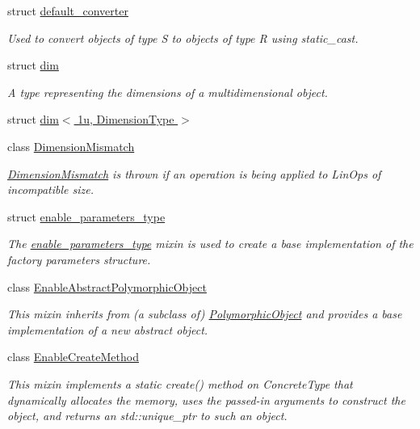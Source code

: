 \begin{DoxyCompactItemize}
struct \hyperlink{structgko_1_1default__converter}{default\+\_\+converter}
\begin{DoxyCompactList}\small\item\em Used to convert objects of type {\ttfamily S} to objects of type {\ttfamily R} using static\+\_\+cast. \end{DoxyCompactList}\item 
struct \hyperlink{structgko_1_1dim}{dim}
\begin{DoxyCompactList}\small\item\em A type representing the dimensions of a multidimensional object. \end{DoxyCompactList}\item 
struct \hyperlink{structgko_1_1dim_3_011u_00_01DimensionType_01_4}{dim$<$ 1u, Dimension\+Type $>$}
\item 
class \hyperlink{classgko_1_1DimensionMismatch}{Dimension\+Mismatch}
\begin{DoxyCompactList}\small\item\em \hyperlink{classgko_1_1DimensionMismatch}{Dimension\+Mismatch} is thrown if an operation is being applied to Lin\+Ops of incompatible size. \end{DoxyCompactList}\item 
struct \hyperlink{structgko_1_1enable__parameters__type}{enable\+\_\+parameters\+\_\+type}
\begin{DoxyCompactList}\small\item\em The \hyperlink{structgko_1_1enable__parameters__type}{enable\+\_\+parameters\+\_\+type} mixin is used to create a base implementation of the factory parameters structure. \end{DoxyCompactList}\item 
class \hyperlink{classgko_1_1EnableAbstractPolymorphicObject}{Enable\+Abstract\+Polymorphic\+Object}
\begin{DoxyCompactList}\small\item\em This mixin inherits from (a subclass of) \hyperlink{classgko_1_1PolymorphicObject}{Polymorphic\+Object} and provides a base implementation of a new abstract object. \end{DoxyCompactList}\item 
class \hyperlink{classgko_1_1EnableCreateMethod}{Enable\+Create\+Method}
\begin{DoxyCompactList}\small\item\em This mixin implements a static {\ttfamily create()} method on {\ttfamily Concrete\+Type} that dynamically allocates the memory, uses the passed-\/in arguments to construct the object, and returns an std\+::unique\+\_\+ptr to such an object. \end{DoxyCompactList}\item 

\end{DoxyCompactItemize}
